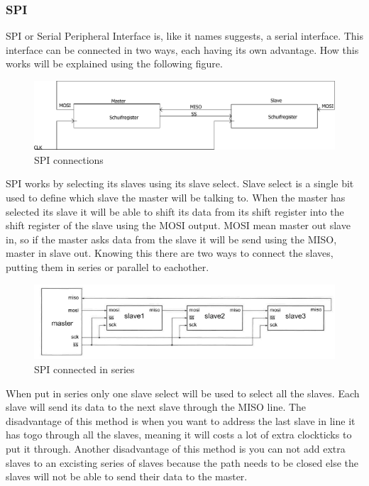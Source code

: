 \documentclass[10pt,a4paper]{article}
\begin{document}
\subsubsection{SPI}
SPI or Serial Peripheral Interface is, like it names suggests, a serial interface. This interface can be connected in two ways, each having its own advantage. How this works will be explained using the following figure.
\begin{figure}[H]
        \centering
        \graphicspath{ {./images/} }
        \includegraphics[scale=.4]{SPI}
        \caption{SPI connections}
        \label{fig:SPIconnections}
\end{figure}
SPI works by selecting its slaves using its slave select. Slave select is a single bit used to define which slave the master will be talking to. When the master has selected its slave it will be able to shift its data from its shift register into the shift register of the slave using the MOSI output. MOSI mean master out slave in, so if the master asks data from the slave it will be send using the MISO, master in slave out. Knowing this there are two ways to connect the slaves, putting them in series or parallel to eachother. 
\begin{figure}[H]
        \centering
        \graphicspath{ {./images/} }
        \includegraphics[scale=.4]{SPIserie}
        \caption{SPI connected in series}
        \label{fig:SPIseries}
\end{figure}
When put in series only one slave select will be used to select all the slaves. Each slave will send its data to the next slave through the MISO line. The disadvantage of this method is when you want to address the last slave in line it has togo through all the slaves, meaning it will costs a lot of extra clockticks to put it through. Another disadvantage of this method is you can not add extra slaves to an excisting series of slaves because the path needs to be closed else the slaves will not be able to send their data to the master.
\end{document}
